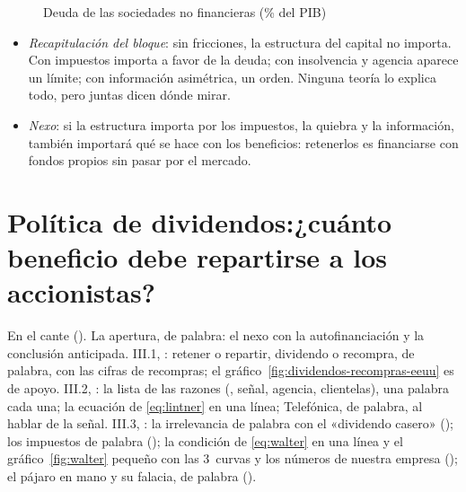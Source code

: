 \documentclass[11pt]{article}
\begin{document}
\begin{figure}[H]
\centering
\caption{Deuda de las sociedades no financieras (\% del PIB)}\label{fig:deuda-snf-pib}
\end{figure}

\begin{itemize}
\item \emph{Recapitulación del bloque}: sin fricciones, la estructura del capital no importa. Con impuestos importa a favor de la deuda; con insolvencia y agencia aparece un límite; con información asimétrica, un orden. Ninguna teoría lo explica todo, pero juntas dicen dónde mirar.
\item \emph{Nexo}: si la estructura importa por los impuestos, la quiebra y la información, también importará qué se hace con los beneficios: retenerlos es financiarse con fondos propios sin pasar por el mercado.
\end{itemize}

\section{Política de dividendos:\newline ¿cuánto beneficio debe repartirse a los accionistas?}\label{sec:dividendos}

\begin{notaopositor}
En el cante (). La apertura, de palabra: el nexo con la autofinanciación y la conclusión anticipada. III.1, : retener o repartir, dividendo o recompra, de palabra, con las cifras de recompras; el gráfico~\ref{fig:dividendos-recompras-eeuu} es de apoyo. III.2, : la lista de las razones (, señal, agencia, clientelas), una palabra cada una; la ecuación de  \eqref{eq:lintner} en una línea; Telefónica, de palabra, al hablar de la señal. III.3, : la irrelevancia de palabra con el «dividendo casero» (); los impuestos de palabra (); la condición de  \eqref{eq:walter} en una línea y el gráfico~\ref{fig:walter} pequeño con las 3~curvas y los números de nuestra empresa (); el pájaro en mano y su falacia, de palabra ().
\end{notaopositor}
\end{document}
